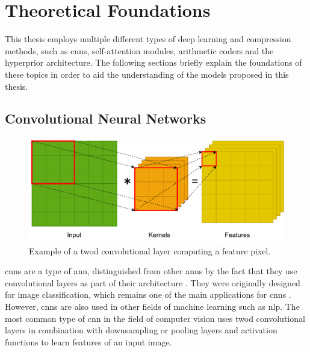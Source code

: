 \chapter{Theoretical Foundations\label{cha:chapter3}}
This thesis employs multiple different types of deep learning and compression methods, such as \acp{cnn}, self-attention modules, arithmetic coders and the hyperprior architecture. The following sections briefly explain the foundations of these topics in order to aid the understanding of the models proposed in this thesis.
\section{Convolutional Neural Networks}
\begin{figure}[t]
\centering
\includegraphics[scale=0.8]{CNN.pdf}
\caption[Example of Convolutional Layer]{Example of a \ac{twod} convolutional layer computing a feature pixel.}
\label{fig:cnn}
\end{figure}

\Acp{cnn} are a type of \ac{ann}, distinguished from other \acp{ann} by the fact that they use convolutional layers as part of their architecture \citep{oshea_introduction_2015}. They were originally designed for image classification, which remains one of the main applications for \acp{cnn} \citep{gu_recent_2018}. However, \acp{cnn} are also used in other fields of machine learning such as \ac{nlp}. The most common type of \ac{cnn} in the field of computer vision uses \ac{twod} convolutional layers in combination with downsampling or pooling layers and activation functions to learn features of an input image. 

